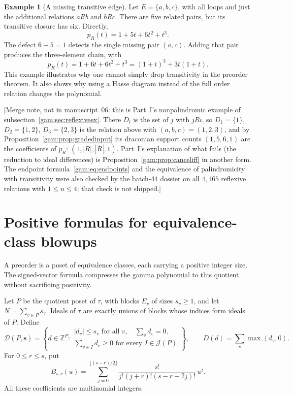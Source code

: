\documentclass[11pt]{article}
\numberwithin{equation}{section}
\theoremstyle{definition}
\newtheorem{example}[theorem]{Example}%
\newcommand{\Z}{\mathbb Z}
\begin{document}
\begin{example}[A missing transitive edge]\label{gam:ex:nontrans}
Let $E=\{a,b,c\}$, with all loops and just the additional relations $aRb$
and $bRc$. There are five related pairs, but its transitive closure has six.
Directly,
\[
 p_R(t)=1+5t+6t^2+t^3.
\]
The defect $6-5=1$ detects the single missing pair $(a,c)$. Adding that pair
produces the three-element chain, with
\[
 p_{\overline R}(t)=1+6t+6t^2+t^3=(1+t)^3+3t(1+t).
\]
This example illustrates why one cannot simply drop transitivity in the
preorder theorem. It also shows why using a Hasse diagram instead of the
full order relation changes the polynomial.
\end{example}
[Merge note, not in manuscript~06: this is Part~I's nonpalindromic example
of subsection~\ref{gam:sec:reflexiveex}. There $D_i$ is the set of $j$ with
$jRi$, so $D_1=\{1\}$, $D_2=\{1,2\}$, $D_3=\{2,3\}$ is the relation above with
$(a,b,c)=(1,2,3)$, and by Proposition~\ref{gam:prop:gradedinput} its
draconian support counts $(1,5,6,1)$ are the coefficients of $p_R$:
$(1,|R|,|\overline R|,1)$. Part~I's explanation of what fails (the reduction
to ideal differences) is Proposition~\ref{gam:prop:canceliff} in another
form. The endpoint formula~\eqref{gam:eq:endpoints} and the equivalence of
palindromicity with transitivity were also checked by the batch-44 dossier
on all $4{,}165$ reflexive relations with $1\le n\le4$; that check is not
shipped.]

\section{Positive formulas for equivalence-class blowups}\label{gam:sec:block}
A preorder is a poset of equivalence classes, each carrying a positive
integer size. The signed-vector formula compresses the gamma polynomial to
this quotient without sacrificing positivity.

Let $P$ be the quotient poset of $\tau$, with blocks $E_v$ of sizes
$s_v\ge1$, and let $N=\sum_{v\in P}s_v$. Ideals of $\tau$ are exactly unions
of blocks whose indices form ideals of $P$. Define
\begin{equation}
 \mathcal D(P,\mathbf s)=
 \left\{d\in\Z^P:
 \begin{array}{l}
 |d_v|\le s_v\text{ for all }v,\quad \sum_vd_v=0,\\
 \sum_{v\in I}d_v\ge0\text{ for every }I\in\mathcal J(P)
 \end{array}\right\},\qquad
 D(d)=\sum_v\max(d_v,0).
 \label{gam:eq:blockdomain}
\end{equation}
For $0\le r\le s$, put
\begin{equation}
 B_{s,r}(u)=\sum_{j=0}^{\lfloor(s-r)/2\rfloor}
       \frac{s!}{j!(j+r)!(s-r-2j)!}\,u^j.
 \label{gam:eq:localB}
\end{equation}
All these coefficients are multinomial integers.
\end{document}
